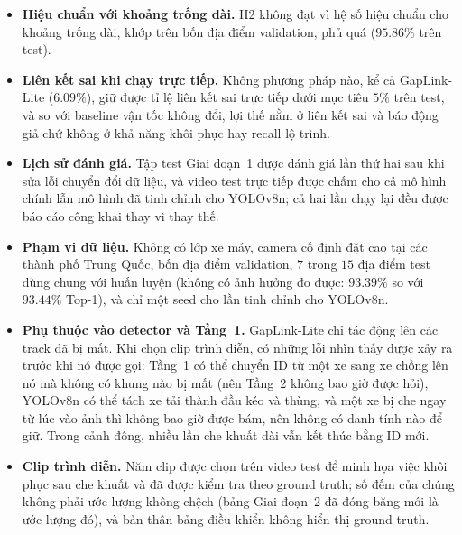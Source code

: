 \begin{itemize}
    \item \textbf{Hiệu chuẩn với khoảng trống dài.} H2 không đạt vì hệ số hiệu chuẩn cho khoảng trống dài, khớp trên bốn địa điểm validation, phủ quá ($95.86\%$ trên test).
    \item \textbf{Liên kết sai khi chạy trực tiếp.} Không phương pháp nào, kể cả GapLink-Lite ($6.09\%$), giữ được tỉ lệ liên kết sai trực tiếp dưới mục tiêu $5\%$ trên test, và so với baseline vận tốc không đổi, lợi thế nằm ở liên kết sai và báo động giả chứ không ở khả năng khôi phục hay recall lộ trình.
    \item \textbf{Lịch sử đánh giá.} Tập test Giai đoạn~1 được đánh giá lần thứ hai sau khi sửa lỗi chuyển đổi dữ liệu, và video test trực tiếp được chấm cho cả mô hình chính lẫn mô hình đã tinh chỉnh cho YOLOv8n; cả hai lần chạy lại đều được báo cáo công khai thay vì thay thế.
    \item \textbf{Phạm vi dữ liệu.} Không có lớp xe máy, camera cố định đặt cao tại các thành phố Trung Quốc, bốn địa điểm validation, $7$ trong $15$ địa điểm test dùng chung với huấn luyện (không có ảnh hưởng đo được: $93.39\%$ so với $93.44\%$ Top-1), và chỉ một seed cho lần tinh chỉnh cho YOLOv8n.
    \item \textbf{Phụ thuộc vào detector và Tầng~1.} GapLink-Lite chỉ tác động lên các track đã bị mất. Khi chọn clip trình diễn, có những lỗi nhìn thấy được xảy ra trước khi nó được gọi: Tầng~1 có thể chuyển ID từ một xe sang xe chồng lên nó mà không có khung nào bị mất (nên Tầng~2 không bao giờ được hỏi), YOLOv8n có thể tách xe tải thành đầu kéo và thùng, và một xe bị che ngay từ lúc vào ảnh thì không bao giờ được bám, nên không có danh tính nào để giữ. Trong cảnh đông, nhiều lần che khuất dài vẫn kết thúc bằng ID mới.
    \item \textbf{Clip trình diễn.} Năm clip được chọn trên video test để minh họa việc khôi phục sau che khuất và đã được kiểm tra theo ground truth; số đếm của chúng không phải ước lượng không chệch (bảng Giai đoạn~2 đã đóng băng mới là ước lượng đó), và bản thân bảng điều khiển không hiển thị ground truth.
\end{itemize}
